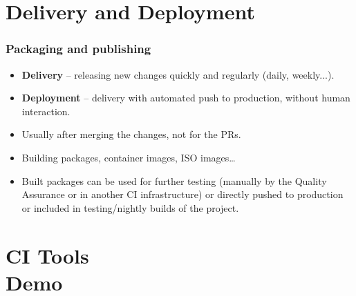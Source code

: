\documentclass[aspectratio=169]{beamer}
\begin{document}
\section{Delivery and Deployment}

\begin{frame}
	\frametitle{Packaging and publishing}
	
	\begin{block}{}
		\begin{itemize}
			\item \textbf{Delivery} -- releasing new changes quickly and regularly (daily, weekly...).
			\item \textbf{Deployment} -- delivery with automated push to production, without human interaction.
		\end{itemize}
	\end{block}
	
	\begin{block}{}
		\begin{itemize}
			\item Usually after merging the changes, not for the PRs.
			\item Building packages, container images, ISO images…
			\item Built packages can be used for further testing (manually by the Quality Assurance or in another CI infrastructure) or directly pushed to production or included in testing/nightly builds of the project.
		\end{itemize}
	\end{block}
\end{frame}


\section{CI Tools \\ \small Demo}
\end{document}
